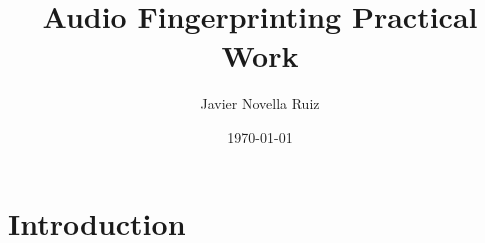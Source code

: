 \documentclass[11pt, a4paper]{article}
\title{Audio Fingerprinting Practical Work}
\author{Javier Novella Ruiz}
\date{\today}
\begin{document}
    

    \tableofcontents

    \newpage

    \section{Introduction}

    \newpage

    \begin{thebibliography}{11}

    



    \end{thebibliography}
\end{document}
